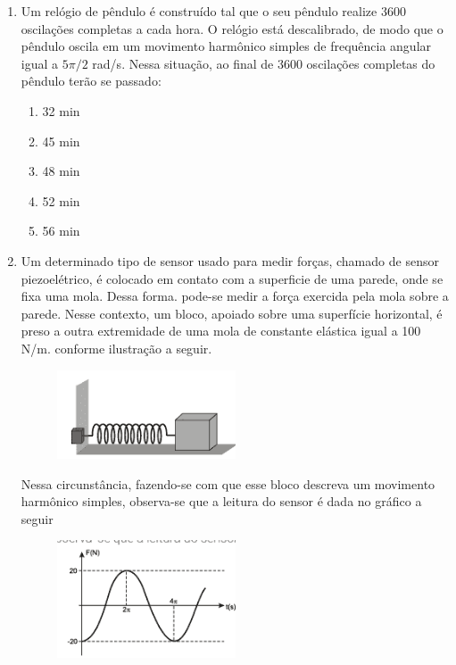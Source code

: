 \documentclass[12pt,letterpaper,fleqn]{article}
\begin{document}
\begin{enumerate}
    
    \item Um relógio de pêndulo é construído tal que o seu pêndulo realize 3600 oscilações completas a cada hora. O relógio está descalibrado, de modo que o pêndulo oscila em um movimento harmônico simples de frequência angular igual a $5\pi/2$ rad/s. Nessa situação, ao final de 3600 oscilações completas do pêndulo terão se passado:
    \begin{enumerate}
        \item 32 min
        \item 45 min
        \item 48 min
        \item 52 min
        \item 56 min
    \end{enumerate}
    
    \item Um determinado tipo de sensor usado para medir forças, chamado de sensor piezoelétrico, é colocado em contato com a superficie de uma parede, onde se fixa uma mola. Dessa forma. pode-se medir a força exercida pela mola sobre a parede. Nesse contexto, um bloco, apoiado sobre uma superfície horizontal, é preso a outra extremidade de uma mola de constante elástica igual a 100 N/m. conforme ilustração a seguir.
    \begin{figure}[H]
        \centering
        \includegraphics[width=0.5\textwidth]{enunciado_4.png}
    \end{figure}
    Nessa circunstância, fazendo-se com que esse bloco descreva um movimento harmônico simples, observa-se que a leitura do sensor é dada no gráfico a seguir
    \begin{figure}[H]
        \centering
        \includegraphics[width=0.5\textwidth]{ex_4.png}

\end{figure}
\end{enumerate}
\end{document}
